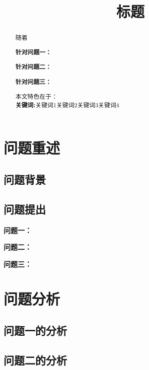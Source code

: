 \documentclass[12pt]{ctexart} %
\date{}
\title{\heiti\zihao{3}标题}
\author{}
\numberwithin{equation}{section}
\begin{document}
	
	\setcounter{page}{1}
	\date{\vspace{-2em}}
	\maketitle
	
	\vspace{-4em}
	\begin{abstract}{\songti} 
	
		随着
		
		\textbf{针对问题一：}
		
		\textbf{针对问题二：}
		
		\textbf{针对问题三：}
		
		本文特色在于：
		\\[\baselineskip]
		\noindent
		\textbf{关键词:}关键词1\qquad 关键词2\qquad 关键词3\qquad 关键词4
	\end{abstract}
	
	\newpage
	
	\section{问题重述}\label{sec:问题重述}
	
	\subsection{问题背景}\label{sec:问题背景}
	
	
	\subsection{问题提出}\label{sec:问题提出}
	
	\textbf{问题一：}
	
	
	\textbf{问题二：}
	
	
	\textbf{问题三：}
	
	
	\section{问题分析}\label{sec:问题分析}
	
	\subsection{问题一的分析}
	
	
	\subsection{问题二的分析}
	
\end{document}
